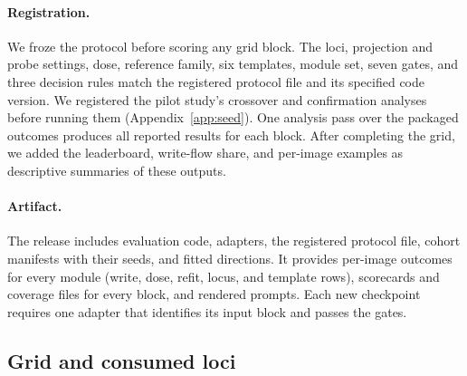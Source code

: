 \documentclass{article}
\begin{document}
\paragraph{Registration.} We froze the protocol before scoring any grid block. The loci, projection and probe settings, dose, reference family, six templates, module set, seven gates, and three decision rules match the registered protocol file and its specified code version. We registered the pilot study's crossover and confirmation analyses before running them (Appendix~\ref{app:seed}). One analysis pass over the packaged outcomes produces all reported results for each block. After completing the grid, we added the leaderboard, write-flow share, and per-image examples as descriptive summaries of these outputs.

\paragraph{Artifact.} The release includes evaluation code, adapters, the registered protocol file, cohort manifests with their seeds, and fitted directions. It provides per-image outcomes for every module (write, dose, refit, locus, and template rows), scorecards and coverage files for every block, and rendered prompts. Each new checkpoint requires one adapter that identifies its input block and passes the gates.

\subsection{Grid and consumed loci}
\label{app:cf-grid}
\end{document}
